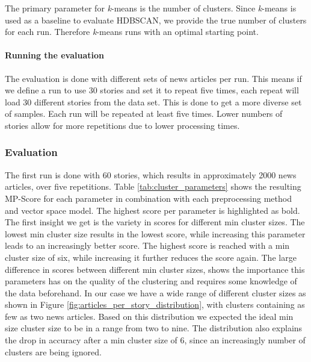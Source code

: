 The primary parameter for \textit{k}-means is the number of clusters. Since \textit{k}-means is used as a baseline to evaluate HDBSCAN, we provide the true number of clusters for each run. Therefore \textit{k}-means runs with an optimal starting point. 

\paragraph{Running the evaluation} The evaluation is done with different sets of news articles per run. This means if we define a run to use 30 stories and set it to repeat five times, each repeat will load 30 different stories from the data set. This is done to get a more diverse set of samples. Each run will be repeated at least five times. Lower numbers of stories allow for more repetitions due to lower processing times.   

\subsubsection{Evaluation}

The first run is done with 60 stories, which results in approximately 2000 news articles, over five repetitions. Table \ref{tab:cluster_parameters} shows the resulting MP-Score for each parameter in combination with each preprocessing method and vector space model. The highest score per parameter is highlighted as bold. The first insight we get  is the variety in scores for different min cluster sizes. The lowest min cluster size results in the lowest score, while increasing this parameter leads to an increasingly better score. The highest score is reached with a min cluster size of six, while increasing it further reduces the score again. The large difference in scores between different min cluster sizes, shows the importance this parameters has on the quality of the clustering and requires some knowledge of the data beforehand. In our case we have a wide range of different cluster sizes as shown in Figure \ref{fig:articles_per_story_distribution}, with clusters containing as few as two news articles. Based on this distribution we expected the ideal min size cluster size to be in a range from two to nine. The distribution also explains the drop in accuracy after a min cluster size of 6, since an increasingly number of clusters are being ignored.

